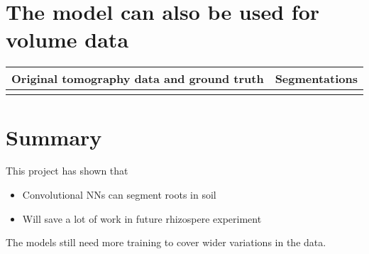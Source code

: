 \documentclass[letterpaper,10pt,english]{sphinxmanual}
\begin{document}
\section{The model can also be used for volume data}
\label{\detokenize{ML4NeutronImageSegmentation:the-model-can-also-be-used-for-volume-data}}


\begin{savenotes}\sphinxattablestart
\centering
\begin{tabulary}{\linewidth}[t]{|T|T|}
\hline
\sphinxstyletheadfamily 
Original tomography data and ground truth
&\sphinxstyletheadfamily 
Segmentations
\\
\hline
{}
&
\\
\hline
\end{tabulary}
\par
\sphinxattableend\end{savenotes}


\section{Summary}
\label{\detokenize{ML4NeutronImageSegmentation:summary}}
This project has shown that
\begin{itemize}
\item {} 
Convolutional NNs can segment roots in soil

\item {} 
Will save a lot of work in future rhizospere experiment

\end{itemize}

The models still need more training to cover wider variations in the data.
\end{document}
